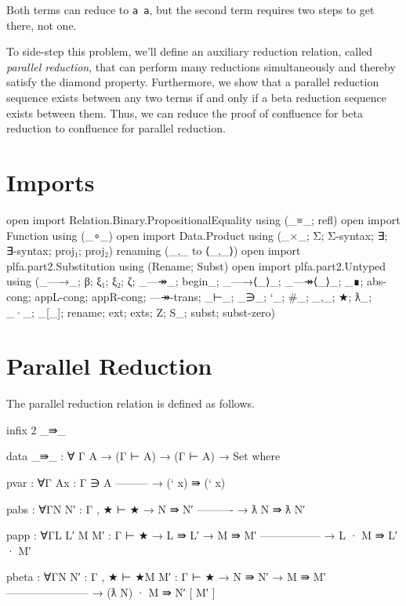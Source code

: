 Both terms can reduce to \texttt{a\ a}, but the second term requires two
steps to get there, not one.

To side-step this problem, we'll define an auxiliary reduction relation,
called \emph{parallel reduction}, that can perform many reductions
simultaneously and thereby satisfy the diamond property. Furthermore, we
show that a parallel reduction sequence exists between any two terms if
and only if a beta reduction sequence exists between them. Thus, we can
reduce the proof of confluence for beta reduction to confluence for
parallel reduction.

\hypertarget{imports}{%
\section{Imports}\label{imports}}

\begin{fence}
\begin{code}
open import Relation.Binary.PropositionalEquality using (_≡_; refl)
open import Function using (_∘_)
open import Data.Product using (_×_; Σ; Σ-syntax; ∃; ∃-syntax; proj₁; proj₂)
  renaming (_,_ to ⟨_,_⟩)
open import plfa.part2.Substitution using (Rename; Subst)
open import plfa.part2.Untyped
  using (_—→_; β; ξ₁; ξ₂; ζ; _—↠_; begin_; _—→⟨_⟩_; _—↠⟨_⟩_; _∎;
  abs-cong; appL-cong; appR-cong; —↠-trans;
  _⊢_; _∋_; `_; #_; _,_; ★; ƛ_; _·_; _[_];
  rename; ext; exts; Z; S_; subst; subst-zero)
\end{code}
\end{fence}

\hypertarget{parallel-reduction}{%
\section{Parallel Reduction}\label{parallel-reduction}}

The parallel reduction relation is defined as follows.

\begin{fence}
\begin{code}
infix 2 _⇛_

data _⇛_ : ∀ {Γ A} → (Γ ⊢ A) → (Γ ⊢ A) → Set where

  pvar : ∀{Γ A}{x : Γ ∋ A}
      ---------
    → (` x) ⇛ (` x)

  pabs : ∀{Γ}{N N′ : Γ , ★ ⊢ ★}
    → N ⇛ N′
      ----------
    → ƛ N ⇛ ƛ N′

  papp : ∀{Γ}{L L′ M M′ : Γ ⊢ ★}
    → L ⇛ L′
    → M ⇛ M′
      -----------------
    → L · M ⇛ L′ · M′

  pbeta : ∀{Γ}{N N′  : Γ , ★ ⊢ ★}{M M′ : Γ ⊢ ★}
    → N ⇛ N′
    → M ⇛ M′
      -----------------------
    → (ƛ N) · M  ⇛  N′ [ M′ ]
\end{code}
\end{fence}


